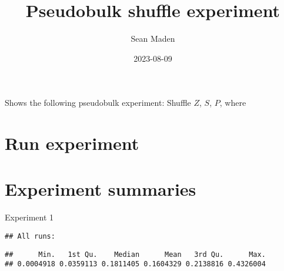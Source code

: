 \documentclass[
]{article}
\title{Pseudobulk shuffle experiment}
\author{Sean Maden}
\date{2023-08-09}
\newenvironment{Shaded}{\begin{snugshade}}{\end{snugshade}}
\newcommand{\AttributeTok}[1]{\textcolor[rgb]{0.13,0.29,0.53}{#1}}
\newcommand{\ControlFlowTok}[1]{\textcolor[rgb]{0.13,0.29,0.53}{\textbf{#1}}}
\newcommand{\FunctionTok}[1]{\textcolor[rgb]{0.13,0.29,0.53}{\textbf{#1}}}
\newcommand{\NormalTok}[1]{#1}
\newcommand{\OtherTok}[1]{\textcolor[rgb]{0.56,0.35,0.01}{#1}}
\newcommand{\SpecialCharTok}[1]{\textcolor[rgb]{0.81,0.36,0.00}{\textbf{#1}}}
\newcommand{\StringTok}[1]{\textcolor[rgb]{0.31,0.60,0.02}{#1}}
\begin{document}
\maketitle

\begin{Shaded}
\end{Shaded}

Shows the following pseudobulk experiment: Shuffle \(Z\), \(S\), \(P\),
where

\hypertarget{run-experiment}{%
\section{Run experiment}\label{run-experiment}}

\hypertarget{experiment-summaries}{%
\section{Experiment summaries}\label{experiment-summaries}}

Experiment 1

\begin{verbatim}
## All runs:
\end{verbatim}

\begin{verbatim}
##      Min.   1st Qu.    Median      Mean   3rd Qu.      Max. 
## 0.0004918 0.0359113 0.1811405 0.1604329 0.2138816 0.4326004
\end{verbatim}
\end{document}
